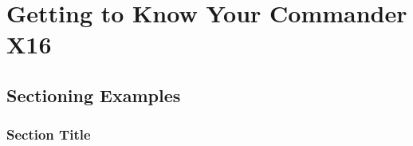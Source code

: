 \documentclass[
	11pt, %
	fleqn, %
	letterpaper, %
]{CommodoreBlueBook}
\begin{document}
\cleardoublepage %


\pagestyle{empty} %

\tableofcontents %

\listoffigures %

\listoftables %

\pagestyle{fancy} %

\cleardoublepage %


\part{Getting to Know Your Commander X16}


\chapterspaceabove{6.75cm} %
\chapterspacebelow{7.25cm} %


\chapter{Sectioning Examples}

\section{Section Title}
\end{document}
